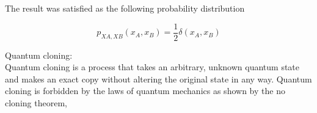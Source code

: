 \documentclass[xelatex,ja=standard,jafont=noto]{bxjsarticle}
\begin{document}
The result was satisfied as the following probability distribution

\begin{equation}
    p_{XA,XB}(x_{A},x_{B})=\frac{1}{2}\delta(x_{A},x_{B})
\end{equation}


Quantum cloning:\\

Quantum cloning is a process that takes an arbitrary, unknown quantum state and makes an exact copy without altering the original state in any way. Quantum cloning is forbidden by the laws of quantum mechanics as shown by the no cloning theorem,
\end{document}
